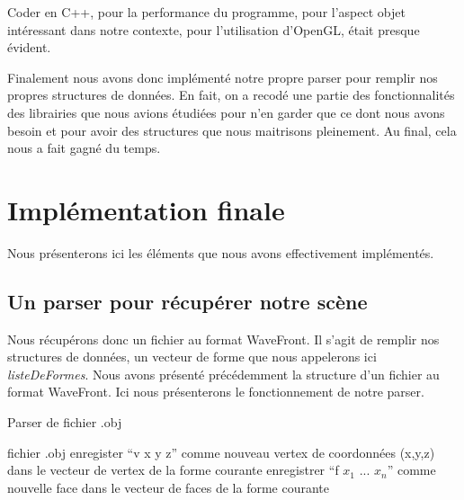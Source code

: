 \documentclass[a4paper,12pt]{report}
\begin{document}
Coder en C++, pour la performance du programme, pour l'aspect objet intéressant dans notre contexte, pour l'utilisation d'OpenGL, était presque évident.

Finalement nous avons donc implémenté notre propre parser pour remplir nos propres structures de données. En fait, on a recodé une partie des fonctionnalités des librairies que nous avions étudiées pour n'en garder que ce dont nous avons besoin et pour avoir des structures que nous maitrisons pleinement. Au final, cela nous a fait gagné du temps.


\chapter{Implémentation finale}

Nous présenterons ici les éléments que nous avons effectivement implémentés.

\section{Un parser pour récupérer notre scène}

Nous récupérons donc un fichier au format WaveFront. Il s'agit de remplir nos structures de données, un vecteur de forme que nous appelerons ici \textit{listeDeFormes}.
Nous avons présenté précédemment la structure d'un fichier au format WaveFront. Ici nous présenterons le fonctionnement de notre parser.

\begin{algorithm}[t]
\caption{Parser de fichier .obj}
\label{algo_naimi_trehel_init}
\begin{algorithmic}[1]
\REQUIRE fichier .obj
    \STATE enregister ``v x y z'' comme nouveau vertex de coordonnées (x,y,z) dans le vecteur de vertex de la forme courante
  \ELSE
    \STATE enregistrer ``f $x_{1}$ ... $x_{n}$'' comme nouvelle face dans le vecteur de faces de la forme courante
    \ENDIF
  \ENDIF
\ENDFOR
\end{algorithmic}
\end{algorithm}
 
\end{document}

